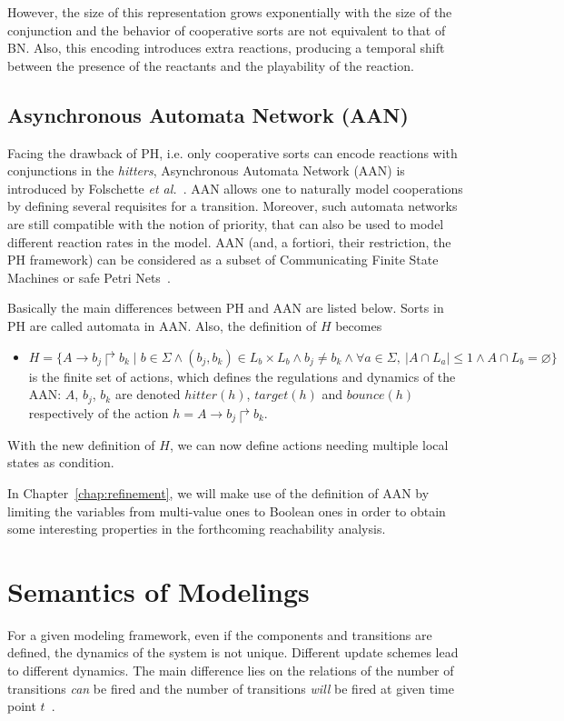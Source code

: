However, the size of this representation grows exponentially with the size of the conjunction and the behavior of cooperative sorts are not equivalent to that of BN. 
Also, this encoding introduces extra reactions, producing a temporal shift between the presence of the reactants and the playability of the reaction.

\subsection{Asynchronous Automata Network (AAN)}\label{sec:AAN}
Facing the drawback of PH, i.e. only cooperative sorts can encode reactions with conjunctions in the \textit{hitters}, Asynchronous Automata Network (AAN) is introduced by Folschette \textit{et al.}~\cite{folschette2015}.
AAN allows one to naturally model cooperations by defining several requisites for a transition.
Moreover, such automata networks are still compatible with the notion of priority, that can also be used to model different reaction rates in the model.
AAN (and, a fortiori, their restriction, the PH framework) can be considered as a subset of Communicating Finite State Machines or safe Petri Nets~\cite{pauleve2012process}.

Basically the main differences between PH and AAN are listed below. 
Sorts in PH are called automata in AAN.
Also, the definition of $H$ becomes

\begin{itemize}
    \item $H=\{A\to b_j\Rsh b_k\mid b\in \Sigma \land (b_j,b_k)\in L_b\times L_b\land b_j\neq b_k\land \forall a \in \Sigma,\ |A\cap L_a|\leq 1 \land A\cap L_b=\varnothing\}$ is the finite set of actions, which defines the regulations and dynamics of the AAN: $A$, $b_j$, $b_k$ are denoted $hitter(h)$, $target(h)$ and $bounce(h)$ respectively of the action $h=A\to b_j\Rsh b_k$.
\end{itemize}

With the new definition of $H$, we can now define actions needing multiple local states as condition.

In Chapter~\ref{chap:refinement}, we will make use of the definition of AAN by limiting the variables from multi-value ones to Boolean ones in order to obtain some interesting properties in the forthcoming reachability analysis.


\section{Semantics of Modelings}\label{sec:semantics}
For a given modeling framework, even if the components and transitions are defined, the dynamics of the system is not unique. 
Different update schemes lead to different dynamics.
The main difference lies on the relations of the number of transitions \textit{can} be fired and the number of transitions \textit{will} be fired at given time point $t$~\cite{ribeiro2018learning,chatain2018boolean}.

